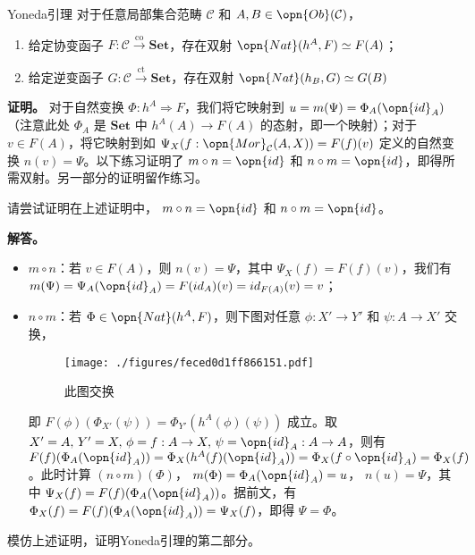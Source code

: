 \begin{theorem}{Yoneda引理}
对于任意局部集合范畴 $\mathcal{C}$ 和 $A,B\in\opn{Ob}(\mathcal{C})$，
\begin{enumerate}
\item 给定协变函子 $F:\mathcal{C}\overset{\text{co}}{\to}\mathbf{Set}$，存在双射 $\opn{Nat}(h^A,F)\simeq F(A)$；
\item 给定逆变函子 $G:\mathcal{C}\overset{\text{ct}}{\to}\mathbf{Set}$，存在双射 $\opn{Nat}(h_B,G)\simeq G(B)$
\end{enumerate}
\end{theorem}
\textbf{证明。}
对于自然变换 $\Phi:h^A\Rightarrow F$，我们将它映射到 $u=m(\Psi)=\Phi_A(\opn{id}_A)$（注意此处 $\Phi_A$ 是 $\mathbf{Set}$ 中 $h^A(A)\to F(A)$ 的态射，即一个映射）；对于 $v\in F(A)$，将它映射到如 $\Psi_X(f:\opn{Mor}_\mathcal{C}(A,X))=F(f)(v)$ 定义的自然变换 $n(v)=\Psi$。以下练习证明了 $m\circ n=\opn{id}$ 和 $n\circ m=\opn{id}$，即得所需双射。另一部分的证明留作练习。
\begin{exercise}{}
请尝试证明在上述证明中， $m\circ n=\opn{id}$ 和 $n\circ m=\opn{id}$。
\end{exercise}
\textbf{解答。}
\begin{itemize}
\item $m\circ n$：若 $v\in F(A)$，则 $n(v)=\Psi$，其中 $\Psi_X(f)=F(f)(v)$，我们有 $m(\Psi)=\Psi_A(\opn{id}_A)=F(id_A)(v)=id_{F(A)}(v)=v$；
\item $n\circ m$：若 $\Phi\in\opn{Nat}(h^A,F)$，则下图对任意 $\phi:X'\to Y'$ 和 $\psi:A\to X'$ 交换，
\begin{figure}[ht]
\centering
\texttt{[image: ./figures/feced0d1ff866151.pdf]}
\caption{此图交换} \label{fig_Cat_3}
\end{figure}
即 $F(\phi)(\Phi_{X'}(\psi))=\Phi_{Y'}(h^A(\phi)(\psi))$ 成立。取 $X'=A,\,Y'=X,\,\phi=f:A\to X,\,\psi=\opn{id}_A:A\to A$，则有 $F(f)(\Phi_A(\opn{id}_A))=\Phi_X(h^A(f)(\opn{id}_A))=\Phi_X(f\circ\opn{id}_A)=\Phi_X(f)$。此时计算 $(n\circ m)(\Phi)$， $m(\Phi)=\Phi_A(\opn{id}_A)=u$， $n(u)=\Psi$，其中 $\Psi_X(f)=F(f)(\Phi_A(\opn{id}_A))$。据前文，有 $\Phi_X(f)=F(f)(\Phi_A(\opn{id}_A))=\Psi_X(f)$，即得 $\Psi=\Phi$。
\end{itemize}
\begin{exercise}{}
模仿上述证明，证明Yoneda引理的第二部分。
\end{exercise}